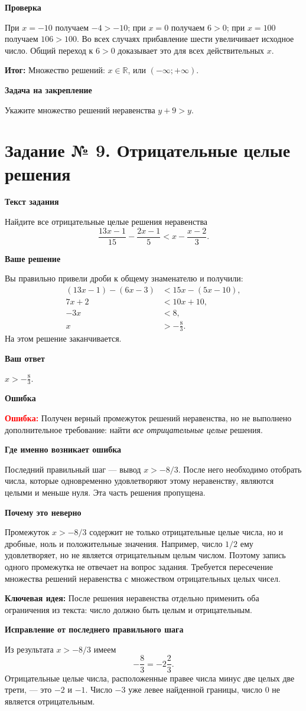 \documentclass[12pt,a4paper]{article}
\newcommand{\err}{\textcolor{red}{\textbf{Ошибка:}}}
\newcommand{\idea}{\textcolor{blue!60!black}{\textbf{Ключевая идея:}}}
\newcommand{\result}{\textcolor{teal!60!black}{\textbf{Итог:}}}
\newcommand{\reviewhead}[1]{\medskip\textbf{#1}\par}
\begin{document}
\reviewhead{Проверка}
При $x=-10$ получаем $-4>-10$; при $x=0$ получаем $6>0$; при $x=100$ получаем $106>100$. Во всех случаях прибавление шести увеличивает исходное число. Общий переход к $6>0$ доказывает это для всех действительных $x$.

\result{} Множество решений: $\boxed{x\in\mathbb R}$, или $(-\infty;+\infty)$.

\reviewhead{Задача на закрепление}
Укажите множество решений неравенства $y+9>y$.

\newpage
{}\label{task:9}
\section*{Задание № 9. Отрицательные целые решения}
\reviewhead{Текст задания}
Найдите все отрицательные целые решения неравенства
\[
\frac{13x-1}{15}-\frac{2x-1}{5}<x-\frac{x-2}{3}.
\]

\reviewhead{Ваше решение}
Вы правильно привели дроби к общему знаменателю и получили:
\begin{align*}
(13x-1)-(6x-3)&<15x-(5x-10),\\
7x+2&<10x+10,\\
-3x&<8,\\
x&>-\frac83.
\end{align*}
На этом решение заканчивается.

\reviewhead{Ваш ответ}
$\displaystyle x>-\frac83$.

\reviewhead{Ошибка}
\err{} Получен верный промежуток решений неравенства, но не выполнено дополнительное требование: найти \emph{все отрицательные целые} решения.

\reviewhead{Где именно возникает ошибка}
Последний правильный шаг --- вывод $x>-8/3$. После него необходимо отобрать числа, которые одновременно удовлетворяют этому неравенству, являются целыми и меньше нуля. Эта часть решения пропущена.

\reviewhead{Почему это неверно}
Промежуток $x>-8/3$ содержит не только отрицательные целые числа, но и дробные, ноль и положительные значения. Например, число $1/2$ ему удовлетворяет, но не является отрицательным целым числом. Поэтому запись одного промежутка не отвечает на вопрос задания. Требуется пересечение множества решений неравенства с множеством отрицательных целых чисел.

\idea{} После решения неравенства отдельно применить оба ограничения из текста: число должно быть целым и отрицательным.

\reviewhead{Исправление от последнего правильного шага}
Из результата $x>-8/3$ имеем
\[
-\frac83=-2\frac23.
\]
Отрицательные целые числа, расположенные правее числа минус две целых две трети, --- это $-2$ и $-1$. Число $-3$ уже левее найденной границы, число $0$ не является отрицательным.
\end{document}
